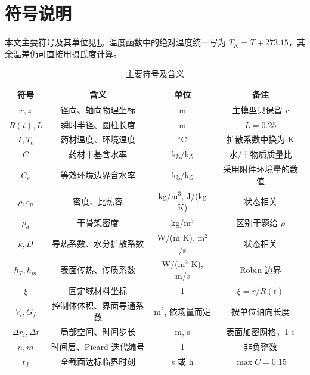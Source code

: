 \newpage
\section{符号说明}

本文主要符号及其单位见\cref{tab:symbols}。温度函数中的绝对温度统一写为 $T_K=T+273.15$，其余温差仍可直接用摄氏度计算。

\begin{table}[H]
\centering
\caption{主要符号及含义}
\label{tab:symbols}
\begin{tabular}{cccc}
\toprule
符号 & 含义 & 单位 & 备注\\
\midrule
$r,z$ & 径向、轴向物理坐标 & m & 主模型只保留 $r$\\
$R(t),L$ & 瞬时半径、圆柱长度 & m & $L=0.25$\\
$T,T_e$ & 药材温度、环境温度 & $^\circ$C & 扩散系数中换为 K\\
$C$ & 药材干基含水率 & kg/kg & 水/干物质质量比\\
$C_e$ & 等效环境边界含水率 & kg/kg & 采用附件环境量的数值\\
$\rho,c_p$ & 密度、比热容 & kg/m$^3$, J/(kg K) & 状态相关\\
$\rho_d$ & 干骨架密度 & kg/m$^3$ & 区别于题给 $\rho$\\
$k,D$ & 导热系数、水分扩散系数 & W/(m K), m$^2$/s & 状态相关\\
$h_T,h_m$ & 表面传热、传质系数 & W/(m$^2$ K), m/s & Robin 边界\\
$\xi$ & 固定域材料坐标 & 1 & $\xi=r/R(t)$\\
$V_i,G_f$ & 控制体体积、界面导通系数 & m$^2$, 依场量而定 & 按单位轴向长度\\
$\Delta r_i,\Delta t$ & 局部空间、时间步长 & m, s & 表面加密网格，1 s\\
$n,m$ & 时间层、Picard 迭代编号 & 1 & 非负整数\\
$t_d$ & 全截面达标临界时刻 & s 或 h & $\max C=0.15$\\
\bottomrule
\end{tabular}
\end{table}
